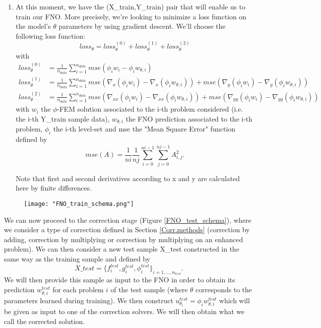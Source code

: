 \begin{enumerate}[label=\textbullet]
\begin{Rem}
	\end{Rem}
	\item At this moment, we have the (X\_train,Y\_train) pair that will enable us to train our FNO. More precisely, we're looking to minimize a loss function on the model's $\theta$ parameters by using gradient descent. We'll choose the following loss function:
	\begin{equation*}
		loss_\theta = loss_\theta^{(0)} + loss_\theta^{(1)} + loss_\theta^{(2)}
	\end{equation*}
	with 
	\begin{align*}
		loss_\theta^{(0)} &= \frac{1}{n_{data}}\sum_{i=1}^{n_{data}} mse(\phi_iw_i-\phi_iw_{\theta,i}) \\
		loss_\theta^{(1)} &= \frac{1}{n_{data}}\sum_{i=1}^{n_{data}} mse(\nabla_x(\phi_iw_i)-\nabla_x(\phi_iw_{\theta,i}))+mse(\nabla_y(\phi_iw_i)-\nabla_y(\phi_iw_{\theta,i})) \\
		loss_\theta^{(2)} &= \frac{1}{n_{data}}\sum_{i=1}^{n_{data}} mse(\nabla_{xx}(\phi_iw_i)-\nabla_{xx}(\phi_iw_{\theta,i})) + mse(\nabla_{yy}(\phi_iw_i)-\nabla_{yy}(\phi_iw_{\theta,i}))
	\end{align*}
	with $w_i$ the $\phi$-FEM solution associated to the i-th problem considered (i.e. the i-th Y\_train sample data), $w_{\theta,i}$ the FNO prediction associated to the i-th problem, $\phi_i$ the i-th level-set and mse the "Mean Square Error" function defined by
	\begin{equation*}
		mse(A)=\frac{1}{ni}\frac{1}{nj}\sum_{i=0}^{ni-1}\sum_{j=0}^{nj-1}A_{i,j}^2.
	\end{equation*}
	\begin{Rem}
		Note that first and second derivatives according to x and y are calculated here by finite differences.
	\end{Rem}
\end{enumerate}

\begin{figure}[H]
	\centering
	\texttt{[image: "FNO\_train\_schema.png"]}
	\label{FNO_train_schema}
\end{figure}

We can now proceed to the correction stage (Figure \ref{FNO_test_schema}), where we consider a type of correction defined in Section \ref{Corr.methods} (correction by adding, correction by multiplying or correction by multiplying on an enhanced problem). We can then consider a new test sample X\_test constructed in the same way as the training sample and defined by
\begin{equation*}
	X\_test = \{f^{test}_i,g^{test}_i,\phi^{test}_i\}_{i=1,\dots,n_{test}}.
\end{equation*}
We will then provide this sample as input to the FNO in order to obtain its prediction $w^{test}_{\theta,i}$ for each problem $i$ of the test sample (where $\theta$ corresponds to the parameters learned during training). We then construct $u^{test}_{\theta_i}=\phi_i w^{test}_{\theta,i}$ which will be given as input to one of the correction solvers. We will then obtain what we call the corrected solution.

